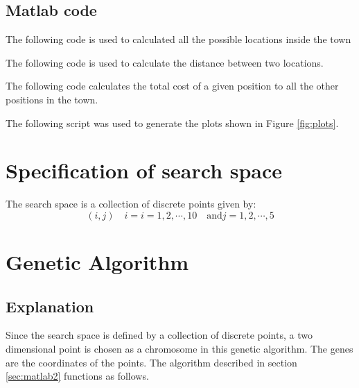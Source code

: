 \documentclass[10pt,a4paper]{article}
\begin{document}
\subsection{Matlab code}
\label{sec:matlab1}

\noindent The following code is used to calculated all the possible locations inside the town


\newpage

\noindent The following code is used to calculate the distance between two locations.


\noindent The following code calculates the total cost of a given position to all the other positions in the town.



\newpage

\noindent The following script was used to generate the plots shown in Figure \ref{fig:plots}.


\section{Specification of search space}
The search space is a collection of discrete points given by:
\[
	(i,j) \quad i= i = 1,2,\cdots, 10 \quad  \text{and} j = 1,2, \cdots, 5
\]
\section{Genetic Algorithm}
\subsection{Explanation}
Since the search space is defined by a collection of discrete points, a two dimensional point is chosen as a chromosome in this genetic algorithm. The genes are the coordinates of the points. The algorithm described in section \ref{sec:matlab2} functions as follows.
\end{document}
